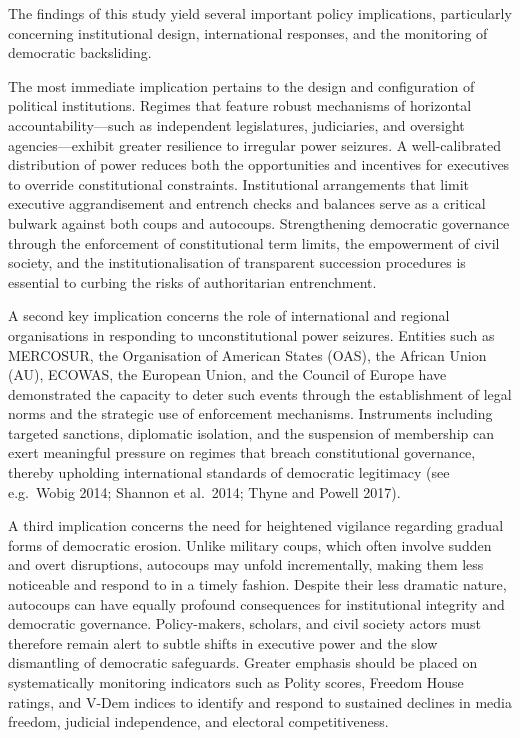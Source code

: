 \documentclass[
  12pt,
]{report}
\begin{document}
The findings of this study yield several important policy implications,
particularly concerning institutional design, international responses,
and the monitoring of democratic backsliding.

The most immediate implication pertains to the design and configuration
of political institutions. Regimes that feature robust mechanisms of
horizontal accountability---such as independent legislatures,
judiciaries, and oversight agencies---exhibit greater resilience to
irregular power seizures. A well-calibrated distribution of power
reduces both the opportunities and incentives for executives to override
constitutional constraints. Institutional arrangements that limit
executive aggrandisement and entrench checks and balances serve as a
critical bulwark against both coups and autocoups. Strengthening
democratic governance through the enforcement of constitutional term
limits, the empowerment of civil society, and the institutionalisation
of transparent succession procedures is essential to curbing the risks
of authoritarian entrenchment.

A second key implication concerns the role of international and regional
organisations in responding to unconstitutional power seizures. Entities
such as MERCOSUR, the Organisation of American States (OAS), the African
Union (AU), ECOWAS, the European Union, and the Council of Europe have
demonstrated the capacity to deter such events through the establishment
of legal norms and the strategic use of enforcement mechanisms.
Instruments including targeted sanctions, diplomatic isolation, and the
suspension of membership can exert meaningful pressure on regimes that
breach constitutional governance, thereby upholding international
standards of democratic legitimacy (see e.g.~Wobig 2014; Shannon et
al.~2014; Thyne and Powell 2017).

A third implication concerns the need for heightened vigilance regarding
gradual forms of democratic erosion. Unlike military coups, which often
involve sudden and overt disruptions, autocoups may unfold
incrementally, making them less noticeable and respond to in a timely
fashion. Despite their less dramatic nature, autocoups can have equally
profound consequences for institutional integrity and democratic
governance. Policy-makers, scholars, and civil society actors must
therefore remain alert to subtle shifts in executive power and the slow
dismantling of democratic safeguards. Greater emphasis should be placed
on systematically monitoring indicators such as Polity scores, Freedom
House ratings, and V-Dem indices to identify and respond to sustained
declines in media freedom, judicial independence, and electoral
competitiveness.
\end{document}
